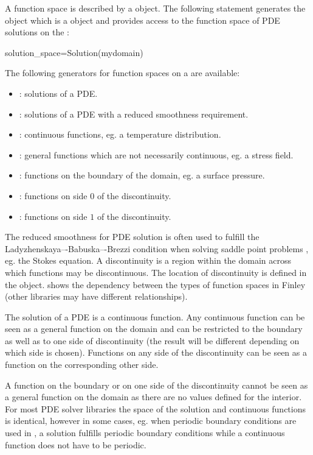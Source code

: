 A function space is described by a \FunctionSpace object.  The
following statement generates the object  which is
a \FunctionSpace object and provides access to the function space of
PDE solutions on the \Domain {}:

\begin{python}
  solution_space=Solution(mydomain)
\end{python}
The following generators for function spaces on a \Domain {} are available: 
\begin{itemize}
\item {}: solutions of a PDE.
\item {}: solutions of a PDE with a reduced smoothness requirement.  
\item {}: continuous functions, eg. a temperature distribution.
\item {}: general functions which are not necessarily continuous, eg. a stress field.
\item {}: functions on the boundary of the domain, eg. a surface pressure.
\item {}: functions on side $0$ of the discontinuity. 
\item {}: functions on side $1$ of the discontinuity.
\end{itemize}

The reduced smoothness for PDE solution is often used to fulfill the Ladyzhenskaya–-Babuska–-Brezzi condition \cite{LBB} when 
solving saddle point problems , eg. the Stokes equation.
A discontinuity  is a region within the domain across which functions may be discontinuous.  
The location of discontinuity is defined in the \Domain object.
 shows the dependency between the types of function spaces in Finley (other libraries may have different relationships).

The solution of a PDE is a continuous function. Any continuous function can be seen as a general function
on the domain and can be restricted to the boundary as well as to one side of
discontinuity (the result will be different depending on 
which side is chosen). Functions on any side of the  
discontinuity can be seen as a function on the corresponding other side. 

A function on the boundary or on one side of
the discontinuity cannot be seen as a general function on the domain as there are no values 
defined for the interior. For most PDE solver libraries
the space of the solution and continuous functions is identical, however in some cases, eg.
when periodic boundary conditions are used in \finley, a solution 
fulfills periodic boundary conditions while a continuous function does not have to be periodic.

